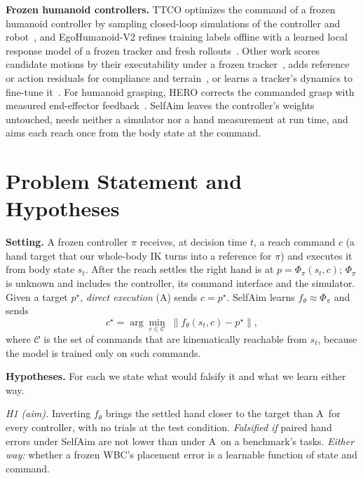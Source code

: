 \documentclass[conference]{IEEEtran}
\newcommand{\Ad}{\textsc{A}}       %
\begin{document}
\textbf{Frozen humanoid controllers.} TTCO optimizes the command of a frozen humanoid controller by sampling closed-loop simulations of the controller and robot~\cite{ttco}, and EgoHumanoid-V2 refines training labels offline with a learned local response model of a frozen tracker and fresh rollouts~\cite{egohumanoidv2}. Other work scores candidate motions by their executability under a frozen tracker~\cite{s3,texedo}, adds reference or action residuals for compliance and terrain~\cite{ila,graft}, or learns a tracker's dynamics to fine-tune it~\cite{humanoidndm}. For humanoid grasping, HERO corrects the commanded grasp with measured end-effector feedback~\cite{hero}. SelfAim leaves the controller's weights untouched, needs neither a simulator nor a hand measurement at run time, and aims each reach once from the body state at the command.

\section{Problem Statement and Hypotheses}\label{sec:hyp}

\textbf{Setting.} A frozen controller $\pi$ receives, at decision time $t$, a reach command $c$ (a hand target that our whole-body IK turns into a reference for $\pi$) and executes it from body state $s_t$. After the reach settles the right hand is at $p=\Phi_\pi(s_t,c)$; $\Phi_\pi$ is unknown and includes the controller, its command interface and the simulator. Given a target $p^\star$, \emph{direct execution} (\Ad) sends $c=p^\star$. SelfAim learns $f_\theta\approx\Phi_\pi$ and sends
\begin{equation}
c^\star=\arg\min_{c\in\mathcal{C}}\;\lVert f_\theta(s_t,c)-p^\star\rVert ,
\label{eq:inv}
\end{equation}
where $\mathcal{C}$ is the set of commands that are kinematically reachable from $s_t$, because the model is trained only on such commands.

\textbf{Hypotheses.} For each we state what would falsify it and what we learn either way.

\emph{H1 (aim).} Inverting $f_\theta$ brings the settled hand closer to the target than \Ad\ for every controller, with no trials at the test condition. \emph{Falsified if} paired hand errors under SelfAim are not lower than under \Ad\ on a benchmark's tasks. \emph{Either way:} whether a frozen WBC's placement error is a learnable function of state and command.
\end{document}
